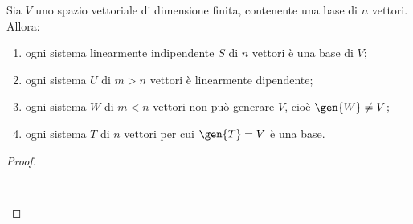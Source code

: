 \begin{teorema} \label{t:base-dimensione}
	Sia $V$ uno spazio vettoriale di dimensione finita, contenente una base di $n$ vettori.
	Allora:
	\begin{enumerate}
		\item ogni sistema linearmente indipendente $S$ di $n$ vettori è una base di $V$;
		\item ogni sistema $U$ di $m>n$ vettori è linearmente dipendente;
		\item ogni sistema $W$ di $m<n$ vettori non può generare $V$, cioè $\gen{W}\neq V$;
		\item ogni sistema $T$ di $n$ vettori per cui $\gen{T}=V$ è una base.
	\end{enumerate}
\end{teorema}
\begin{proof}
\begin{verbatim}


\end{verbatim}
\end{proof}
